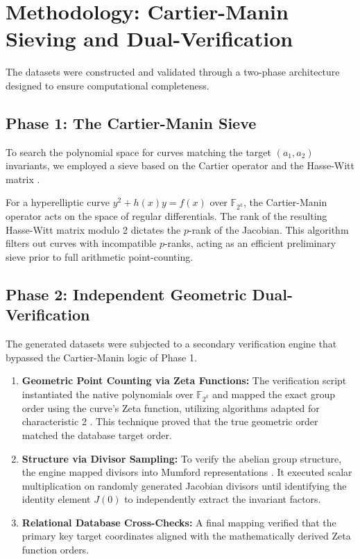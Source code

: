 \documentclass[12pt, letterpaper]{article}
\begin{document}
\section{Methodology: Cartier-Manin Sieving and Dual-Verification}
The datasets were constructed and validated through a two-phase architecture designed to ensure computational completeness.

\subsection{Phase 1: The Cartier-Manin Sieve}
To search the polynomial space for curves matching the target $(a_1, a_2)$ invariants, we employed a sieve based on the Cartier operator \cite{Cartier1958} and the Hasse-Witt matrix \cite{Manin1963}. 

For a hyperelliptic curve $y^2 + h(x)y = f(x)$ over $\mathbb{F}_{2^k}$, the Cartier-Manin operator acts on the space of regular differentials. The rank of the resulting Hasse-Witt matrix modulo 2 dictates the $p$-rank of the Jacobian. This algorithm filters out curves with incompatible $p$-ranks, acting as an efficient preliminary sieve prior to full arithmetic point-counting.

\subsection{Phase 2: Independent Geometric Dual-Verification}
The generated datasets were subjected to a secondary verification engine that bypassed the Cartier-Manin logic of Phase 1.

\begin{enumerate}
    \item \textbf{Geometric Point Counting via Zeta Functions:} The verification script instantiated the native polynomials over $\mathbb{F}_{2^k}$ and mapped the exact group order using the curve's Zeta function, utilizing algorithms adapted for characteristic 2 \cite{Denef2006}. This technique proved that the true geometric order matched the database target order.
    \item \textbf{Structure via Divisor Sampling:} To verify the abelian group structure, the engine mapped divisors into Mumford representations \cite{Cantor1987}. It executed scalar multiplication on randomly generated Jacobian divisors until identifying the identity element $J(0)$ \cite{Sutherland2007} to independently extract the invariant factors.
    \item \textbf{Relational Database Cross-Checks:} A final mapping verified that the primary key target coordinates aligned with the mathematically derived Zeta function orders.
\end{enumerate}
\end{document}
